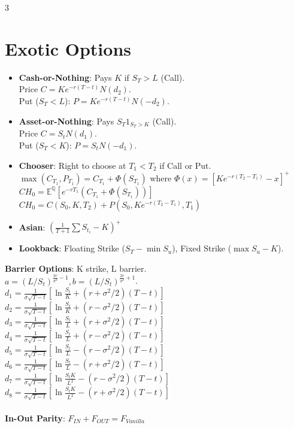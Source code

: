 \documentclass[8pt, a4paper, landscape]{extarticle}
\newcommand{\E}{\mathbb{E}}
\newcommand{\Q}{\mathbb{Q}}
\begin{document}
\begin{multicols*}{3}
\section*{Exotic Options}
\begin{itemize}
    \item \textbf{Cash-or-Nothing}: Pays $K$ if $S_T > L$ (Call).\\ Price $C = K e^{-r(T-t)} N(d_2)$. \\
    Put ($S_T < L$): $P = K e^{-r(T-t)} N(-d_2)$.
    \item \textbf{Asset-or-Nothing}: Pays $S_T 1_{S_T > K}$ (Call).\\Price $C = S_t N(d_1)$. \\
    Put ($S_T < K$): $P = S_t N(-d_1)$.
    \item \textbf{Chooser}: Right to choose at $T_1 < T_2$ if Call or Put. \\
    $\max(C_{T_1}, P_{T_1}) = C_{T_1} + \Phi(S_{T_1})$ where $\Phi(x) = [K e^{-r(T_2-T_1)} - x]^+$ \\
    $CH_0 = \E^\Q[e^{-r T_1} (C_{T_1} + \Phi(S_{T_1}))]$ \\
    $CH_0 = C(S_0, K, T_2) + P(S_0, K e^{-r(T_2-T_1)}, T_1)$
    \item \textbf{Asian}: $\left(\frac{1}{T+1} \sum S_{t_i} - K\right)^+$
    \item \textbf{Lookback}: Floating Strike ($S_T - \min S_u$), Fixed Strike ($\max S_u - K$).
\end{itemize}
\textbf{Barrier Options}:
K strike, L barrier.\\
$a = (L/S_t)^{\frac{2r}{\sigma^2} - 1}, b = (L/S_t)^{\frac{2r}{\sigma^2} + 1}$. \\
$d_1 = \frac{1}{\sigma \sqrt{T-t}} \left[ \ln \frac{S_t}{K} + (r+ \sigma^2/2)(T-t) \right]$ \\
$d_2 = \frac{1}{\sigma \sqrt{T-t}} \left[ \ln \frac{S_t}{K} + (r- \sigma^2/2)(T-t) \right]$ \\
$d_3 = \frac{1}{\sigma \sqrt{T-t}} \left[ \ln \frac{S_t}{L} + (r+ \sigma^2/2)(T-t) \right]$ \\
$d_4 = \frac{1}{\sigma \sqrt{T-t}} \left[ \ln \frac{S_t}{L} + (r- \sigma^2/2)(T-t) \right]$ \\
$d_5 = \frac{1}{\sigma \sqrt{T-t}} \left[ \ln \frac{S_t}{L} - (r- \sigma^2/2)(T-t) \right]$ \\
$d_6 = \frac{1}{\sigma \sqrt{T-t}} \left[ \ln \frac{S_t}{L} - (r+ \sigma^2/2)(T-t) \right]$ \\
$d_7 = \frac{1}{\sigma \sqrt{T-t}} \left[ \ln \frac{S_t K}{L^2} - (r- \sigma^2/2)(T-t) \right]$ \\
$d_8 = \frac{1}{\sigma \sqrt{T-t}} \left[ \ln \frac{S_t K}{L^2} - (r+ \sigma^2/2)(T-t) \right]$ \\
\\
\textbf{In-Out Parity}: $F_{IN} + F_{OUT} = F_{Vanilla}$


\end{multicols*}
\end{document}
